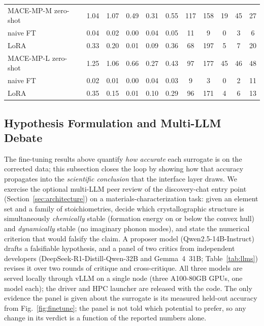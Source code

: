 \documentclass[conference]{IEEEtran}
\def\acs#1{#1}%
\begin{document}
\begin{table}[t]
\begin{tabular}{lccccc@{\hspace{1.5em}}ccccc}
\addlinespace
MACE-MP-M zero-shot  & 1.04 & 1.07 & 0.49 & 0.31 & 0.55 & 117 & 158 & 19 & 45 & 27 \\
\quad naive FT       & 0.04 & 0.02 & 0.00 & 0.04 & 0.05 & 11  & 9   & 0  & 3  & 6  \\
\quad LoRA           & 0.33 & 0.20 & 0.01 & 0.09 & 0.36 & 68 & 197 & 5 & 7 & 20 \\
\addlinespace
MACE-MP-L zero-shot  & 1.25 & 1.06 & 0.66 & 0.27 & 0.43 & 97 & 177 & 45 & 46 & 48 \\
\quad naive FT       & 0.02 & 0.01 & 0.00 & 0.04 & 0.03 & 9  & 3   & 0  & 2  & 11 \\
\quad LoRA           & 0.35 & 0.15 & 0.01 & 0.10 & 0.29 & 96 & 171 & 4  & 6  & 13 \\
\bottomrule
\end{tabular}
\end{table}
\fi

\subsection{Hypothesis Formulation and Multi-LLM Debate}
\label{sec:results:hypothesis}
The fine-tuning results above quantify \emph{how accurate} each surrogate is on
the corrected data; this subsection closes the loop by showing how that accuracy
propagates into the \emph{scientific conclusion} that the interface layer draws.
We exercise the optional multi-\acs{LLM} peer review of the discovery-chat entry
point (Section~\ref{sec:architecture}) on a materials-characterization task:
given an element set and a family of stoichiometries, decide which
crystallographic structure is simultaneously \emph{chemically} stable
(formation energy on or below the convex hull) and \emph{dynamically} stable
(no imaginary phonon modes), and state the numerical criterion that would
falsify the claim. A proposer model (Qwen2.5-14B-Instruct) drafts a falsifiable
hypothesis, and a panel of two critics from independent developers
(DeepSeek-R1-Distill-Qwen-32B and Gemma~4~31B; Table~\ref{tab:llms}) revises it
over two rounds of critique and cross-critique. All three models are served
locally through vLLM on a single node (three A100-80GB \acsp{GPU}, one model
each); the driver and \acs{HPC} launcher are released with the code. The only
evidence the panel is given about the surrogate is its measured held-out
accuracy from Fig.~\ref{fig:finetune}; the panel is not told which potential to
prefer, so any change in its verdict is a function of the reported numbers alone.
\end{document}
